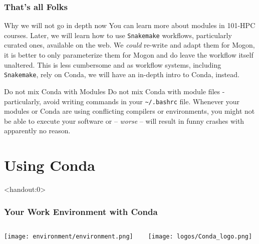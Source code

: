 \begin{frame}[fragile]
  \frametitle{That's all Folks}
   \vspace{-0.8em}
  \begin{alertblock}{Why we will not go in depth now}
You can learn more about modules in 101-HPC courses. Later, we will learn how to use \texttt{Snakemake} workflows, particularly curated ones, available on the web. We \emph{could} re-write and adapt them for Mogon, it is better to only parameterize them for Mogon and do leave the workflow itself unaltered. This is less cumbersome and as workflow systems, including \texttt{Snakemake}, rely on Conda, we will have an in-depth intro to Conda, instead.
  \end{alertblock}
  \vfill
  \begin{alertblock}{Do not mix Conda with Modules}
   Do not mix Conda with module files - particularly, avoid writing  commands in your \texttt{\textasciitilde/.bashrc} file.\newline
   Whenever your modules or Conda are using conflicting compilers or environments, you might not be able to execute your software or -- \emph{worse} -- will result in funny crashes with apparently no reason.
  \end{alertblock}

\end{frame}

\section{Using Conda}

\begin{frame}<handout:0> 
  \frametitle{Your Work Environment with Conda}
  \begin{columns}
    \begin{column}{0.5\textwidth}\centering
      \texttt{[image: environment/environment.png]}
    \end{column}
    \begin{column}{0.5\textwidth}\centering
      \texttt{[image: logos/Conda\_logo.png]}   
    \end{column}
  \end{columns}
\end{frame}

